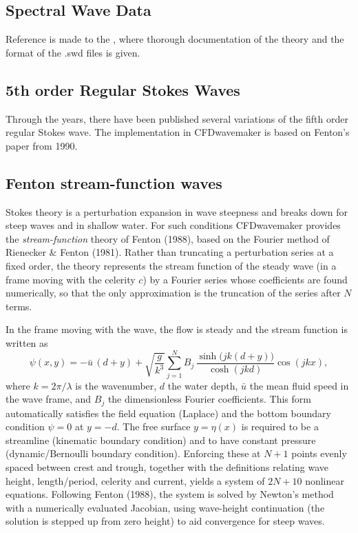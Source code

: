 \subsection{Spectral Wave Data}
Reference is made to the , where thorough documentation of the theory and the format of the .swd files is given.

\subsection{5th order Regular Stokes Waves}
Through the years, there have been published several variations of the fifth order regular Stokes wave. The implementation in CFDwavemaker is based on Fenton's paper from 1990.

\subsection{Fenton stream-function waves}
Stokes theory is a perturbation expansion in wave steepness and breaks down for steep waves and in shallow water. For such conditions CFDwavemaker provides the \emph{stream-function} theory of Fenton (1988), based on the Fourier method of Rienecker \& Fenton (1981). Rather than truncating a perturbation series at a fixed order, the theory represents the stream function of the steady wave (in a frame moving with the celerity $c$) by a Fourier series whose coefficients are found numerically, so that the only approximation is the truncation of the series after $N$ terms.

In the frame moving with the wave, the flow is steady and the stream function is written as
\begin{equation}
\psi(x,y) = -\bar{u}\,(d+y) + \sqrt{\frac{g}{k^3}}\sum_{j=1}^{N} B_j\,\frac{\sinh\!\big(jk(d+y)\big)}{\cosh(jkd)}\cos(jkx),
\end{equation}
where $k=2\pi/\lambda$ is the wavenumber, $d$ the water depth, $\bar u$ the mean fluid speed in the wave frame, and $B_j$ the dimensionless Fourier coefficients. This form automatically satisfies the field equation (Laplace) and the bottom boundary condition $\psi=0$ at $y=-d$. The free surface $y=\eta(x)$ is required to be a streamline (kinematic boundary condition) and to have constant pressure (dynamic/Bernoulli boundary condition). Enforcing these at $N+1$ points evenly spaced between crest and trough, together with the definitions relating wave height, length/period, celerity and current, yields a system of $2N+10$ nonlinear equations. Following Fenton (1988), the system is solved by Newton's method with a numerically evaluated Jacobian, using wave-height continuation (the solution is stepped up from zero height) to aid convergence for steep waves.

